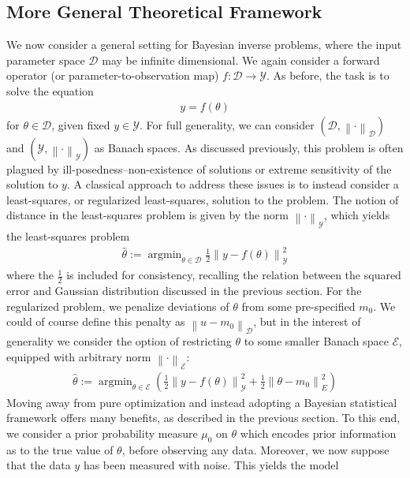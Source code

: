 \documentclass[12pt]{article}
\newcommand*{\norm}[1]{\left\lVert#1\right\rVert}
\DeclareMathOperator*{\argmin}{argmin}
\begin{document}
\subsection{More General Theoretical Framework}
We now consider a general setting for Bayesian inverse problems, where the input parameter space $\mathcal{D}$ may be infinite dimensional. We again consider a forward operator (or parameter-to-observation 
map) $f: \mathcal{D} \to \mathcal{Y}$. As before, the task is to solve the equation
\begin{align*}
y = f(\theta)
\end{align*}
for $\theta \in \mathcal{D}$, given fixed $y \in \mathcal{Y}$. For full generality, we can consider $(\mathcal{D}, \norm{\cdot}_{\mathcal{D}})$ and $(\mathcal{Y},  \norm{\cdot}_{\mathcal{Y}})$ as Banach spaces. As discussed previously, this problem is often plagued by ill-posedness--non-existence 
of solutions or extreme sensitivity of the solution to $y$. A classical approach to address these issues is to instead consider a least-squares, or regularized least-squares, solution to the problem. The notion of distance in the least-squares problem is given by the norm $\norm{\cdot}_{\mathcal{Y}}$, which yields the least-squares problem  
\begin{align*}
\hat{\theta} := \argmin_{\theta \in \mathcal{D}} \frac{1}{2} \norm{y - f(\theta)}_{\mathcal{Y}}^2
\end{align*}
where the $\frac{1}{2}$ is included for consistency, recalling the relation between the squared error and Gaussian distribution discussed in the previous section. For the regularized problem, we penalize deviations 
of $\theta$ from some pre-specified $m_0$. We could of course define this penalty as $\norm{u - m_0}_{\mathcal{D}}$, but in the interest of generality we consider the option of restricting $\theta$ to some smaller 
Banach space $\mathcal{E}$, equipped with arbitrary norm $\norm{\cdot}_\mathcal{E}$:
\begin{align*}
\hat{\theta} := \argmin_{\theta \in \mathcal{E}} \left(\frac{1}{2} \norm{y - f(\theta)}_{\mathcal{Y}}^2 + \frac{1}{2} \norm{\theta - m_0}^2_E\right)
\end{align*}
Moving away from pure optimization and instead adopting a Bayesian statistical framework offers many benefits, as described in the previous section. To this end, we consider a prior probability measure $\mu_0$ on 
$\theta$ which encodes prior information as to the true value of $\theta$, before observing any data. Moreover, we now suppose that the data $y$ has been measured with noise. This yields the model
\end{document}
